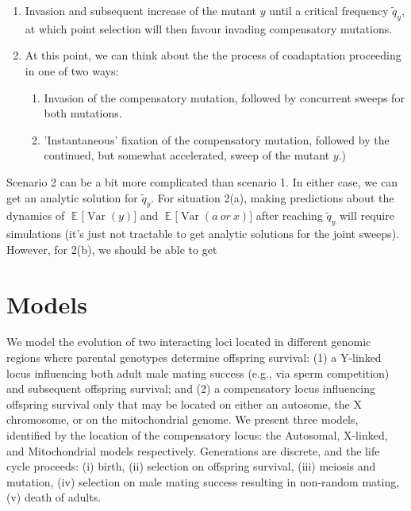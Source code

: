 \documentclass{article}
\DeclareMathOperator{\Var}{Var}
\begin{document}
\begin{enumerate}
	\item Invasion and subsequent increase of the mutant $y$ until a critical frequency $\tilde{q}_y$, at which point selection will then favour invading compensatory mutations.
	\item At this point, we can think about the the process of coadaptation proceeding in one of two ways:
	\begin{enumerate}
		\item Invasion of the compensatory mutation, followed by concurrent sweeps for both mutations.
		\item 'Instantaneous' fixation of the compensatory mutation, followed by the continued, but somewhat accelerated, sweep of the mutant $y$.)
	\end{enumerate}
\end{enumerate}

\noindent{} Scenario 2 can be a bit more complicated than scenario 1. In either case, we can get an analytic solution for $\tilde{q}_y$. For situation 2(a), making predictions about the dynamics of $\mathop{{}\mathbb{E}}\Big[\Var(y)\Big]$ and $\mathop{{}\mathbb{E}}\Big[\Var(a~or~x)\Big]$ after reaching $\tilde{q}_y$ will require simulations (it's just not tractable to get analytic solutions for the joint sweeps). However, for 2(b), we should be able to get 



\section{Models} \label{sec:Models}
We model the evolution of two interacting loci located in different genomic regions where parental genotypes determine offspring survival: (1) a Y-linked locus influencing both adult male mating success (e.g., via sperm competition) and subsequent offspring survival; and (2) a compensatory locus influencing offspring survival only that may be located on either an autosome, the X chromosome, or on the mitochondrial genome. We present three models, identified by the location of the compensatory locus: the Autosomal, X-linked, and Mitochondrial models respectively. Generations are discrete, and the life cycle proceeds: (i) birth, (ii) selection on offspring survival, (iii) meiosis and mutation, (iv) selection on male mating success resulting in non-random mating, (v) death of adults. 
\end{document}

